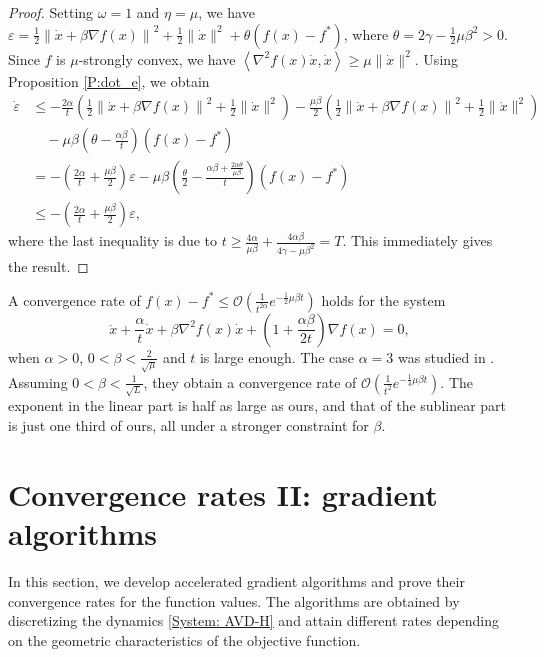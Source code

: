 \documentclass[onefignum,onetabnum]{siamart220329}
\begin{document}
\begin{proof}
Setting $\omega=1$ and $\eta=\mu$, we have $\varepsilon = \frac{1}{2}\left\| \dot{x} + \beta\nabla f(x) \right\|^2 + \frac{1}{2}\| \dot{x} \|^2 + \theta (f(x) - f^*)$, where $\theta = 2\gamma - \frac{1}{2}\mu\beta^2>0$. Since $f$ is $\mu$-strongly convex, we have $\left\langle \nabla^2 f(x)\dot{x}, \dot{x} \right\rangle \ge \mu\| \dot{x} \|^2$. Using Proposition \ref{P:dot_e}, we obtain
\begin{align*}
\dot{\varepsilon}
&\le -\frac{2\alpha}{t} \left( \frac{1}{2}\left\| \dot{x} + \beta\nabla f(x) \right\|^2 + \frac{1}{2} \| \dot{x} \|^2 \right) 
   - \frac{\mu\beta}{2} \left( \frac{1}{2}\left\| \dot{x} + \beta\nabla f(x) \right\|^2 + \frac{1}{2} \| \dot{x} \|^2 \right) \\
&\quad - \mu\beta\left( \theta - \frac{\alpha\beta}{t} \right) \left( f(x) - f^* \right) \\
& = -\left(\frac{2\alpha}{t}+\frac{\mu\beta}{2}\right) \varepsilon  - \mu\beta\left( \frac{\theta}{2} - \frac{\alpha\beta + \frac{2\alpha\theta}{\mu\beta}}{t} \right) ( f(x) - f^* )\\
&\le -\left(\frac{2\alpha}{t}+\frac{\mu\beta}{2}\right) \varepsilon, 
\end{align*}
where the last inequality is due to $t\ge \frac{4\alpha}{\mu\beta} + \frac{4\alpha\beta}{4\gamma-\mu\beta^2}=T$. This immediately gives the result.
\end{proof}


\begin{remark}
A convergence rate of 
$f(x) - f^* \le \mathcal{O}\left( \frac{1}{t^{2\alpha}}e^{-\frac{1}{2}\mu\beta t} \right)$ holds for the system
$$ \ddot{x} + \frac{\alpha}{t}\dot{x} + \beta\nabla^2 f(x)\dot{x} + \left( 1 + \frac{\alpha\beta}{2t} \right) \nabla f(x) = 0 ,$$
when $\alpha>0$, $0<\beta<\frac{2}{\sqrt{\mu}}$ and $t$ is large enough. The case $\alpha=3$ was studied in \cite{Shi_2024}. Assuming $0<\beta<\frac{1}{\sqrt{L}}$, they obtain a convergence rate of $\mathcal{O}\left( \frac{1}{t^2}e^{-\frac{1}{4}\mu\beta t} \right)$. The exponent in the linear part is half as large as ours, and that of the sublinear part is just one third of ours, all under a stronger constraint for $\beta$.
\end{remark}




\section{Convergence rates II: gradient algorithms}\label{Sec: gradient_algorithms}
In this section, we develop accelerated gradient algorithms and prove their convergence rates for the function values. The algorithms are obtained by discretizing the dynamics \eqref{System: AVD-H} and attain different rates depending on the geometric characteristics of the objective function.
\end{document}
